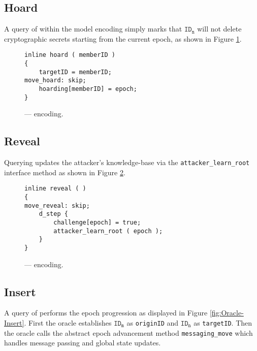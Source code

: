 \hypertarget{hoard}{%
\subsection{Hoard}\label{hoard}}

A query of  within the  model encoding simply marks that \(\mathtt{ID_n}\) will not delete cryptographic secrets starting from the current epoch, as shown in Figure \ref{fig:Oracle-Hoard}.

\begin{figure}[h!]
  \centering
  \caption{\label{fig:Oracle-Hoard}\CGKAmod{}{}{} ---  encoding.}
\begin{verbatim}
inline hoard ( memberID )
{
    targetID = memberID;
move_hoard: skip;
    hoarding[memberID] = epoch;
}
\end{verbatim}
\end{figure}


\hypertarget{reveal}{%
\subsection{Reveal}\label{reveal}}

Querying  updates the attacker's knowledge-base via the \texttt{attacker\_learn\_root} interface method as shown in Figure \ref{fig:Oracle-Reveal}.

\begin{figure}[h!]
  \centering
  \caption{\label{fig:Oracle-Reveal}\CGKAmod{}{}{} ---  encoding.}
\begin{verbatim}
inline reveal ( )
{
move_reveal: skip;
    d_step {
        challenge[epoch] = true;
        attacker_learn_root ( epoch );
    }
}
\end{verbatim}
\end{figure}


\hypertarget{insert}{%
\subsection{Insert}\label{insert}}

A query of  performs the epoch progression as displayed in Figure \ref{fig:Oracle-Insert}.
First the oracle establishes \(\mathtt{ID_m}\) as \texttt{originID} and \(\mathtt{ID_n}\) as \texttt{targetID}.
Then the oracle calls the abstract epoch advancement method \texttt{messaging\_move} which handles message passing and global state updates.

